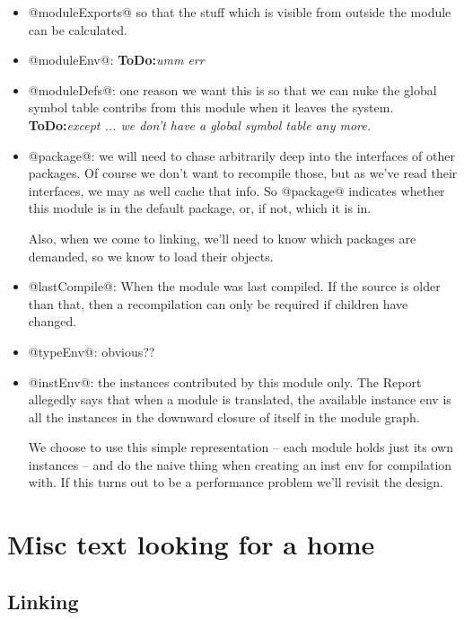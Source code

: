 \documentclass[11pt]{article}
\newcommand{\ToDo}[1]{{{\bf ToDo:}\sl #1}}
\begin{document}
\begin{itemize}
\item @moduleExports@ so that the stuff which is visible from outside
      the module can be calculated.
\item @moduleEnv@: \ToDo{umm err}
\item @moduleDefs@: one reason we want this is so that we can nuke the
      global symbol table contribs from this module when it leaves the
      system.  \ToDo{except ... we don't have a global symbol table any
      more.}
\item @package@: we will need to chase arbitrarily deep into the
      interfaces of other packages.  Of course we don't want to 
      recompile those, but as we've read their interfaces, we may
      as well cache that info.  So @package@ indicates whether this
      module is in the default package, or, if not, which it is in.

      Also, when we come to linking, we'll need to know which
      packages are demanded, so we know to load their objects.

\item @lastCompile@: When the module was last compiled.  If the 
      source is older than that, then a recompilation can only be
      required if children have changed.
\item @typeEnv@: obvious??
\item @instEnv@: the instances contributed by this module only.  The
      Report allegedly says that when a module is translated, the
      available
      instance env is all the instances in the downward closure of
      itself in the module graph.
      
      We choose to use this simple representation -- each module 
      holds just its own instances -- and do the naive thing when
      creating an inst env for compilation with.  If this turns out
      to be a performance problem we'll revisit the design.
\end{itemize}



\section{Misc text looking for a home}

\subsection*{Linking}
\end{document}

